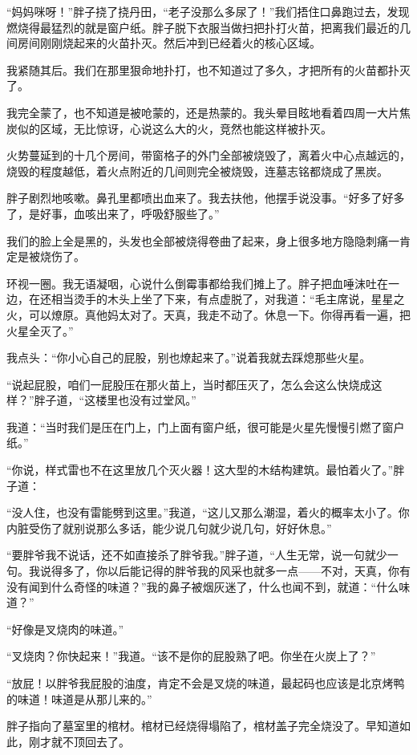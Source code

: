 “妈妈咪呀！”胖子挠了挠丹田，“老子没那么多尿了！”我们捂住口鼻跑过去，发现燃烧得最猛烈的就是窗户纸。胖子脱下衣服当做扫把扑打火苗，把离我们最近的几间房间刚刚烧起来的火苗扑灭。然后冲到已经着火的核心区域。

我紧随其后。我们在那里狠命地扑打，也不知道过了多久，才把所有的火苗都扑灭了。

我完全蒙了，也不知道是被呛蒙的，还是热蒙的。我头晕目眩地看着四周一大片焦炭似的区域，无比惊讶，心说这么大的火，竞然也能这样被扑灭。

火势蔓延到的十几个房间，带窗格子的外门全部被烧毁了，离着火中心点越远的，烧毁的程度越低，着火点附近的几间则完全被烧毁，连墓志铭都烧成了黑炭。

胖子剧烈地咳嗽。鼻孔里都喷出血来了。我去扶他，他摆手说没事。“好多了好多了，是好事，血咳出来了，呼吸舒服些了。”

我们的脸上全是黑的，头发也全部被烧得卷曲了起来，身上很多地方隐隐刺痛一肯定是被烧伤了。

环视一圈。我无语凝咽，心说什么倒霉事都给我们摊上了。胖子把血唾沫吐在一边，在还相当烫手的木头上坐了下来，有点虚脱了，对我道：“毛主席说，星星之火，可以燎原。真他妈太对了。天真，我走不动了。休息一下。你得再看一遍，把火星全灭了。”

我点头：“你小心自己的屁股，别也燎起来了。”说着我就去踩熄那些火星。

“说起屁股，咱们一屁股压在那火苗上，当时都压灭了，怎么会这么快烧成这样？”胖子道，“这楼里也没有过堂风。”

我道：“当时我们是压在门上，门上面有窗户纸，很可能是火星先慢慢引燃了窗户纸。”

“你说，样式雷也不在这里放几个灭火器！这大型的木结构建筑。最怕着火了。”胖子道：

“没人住，也没有雷能劈到这里。”我道，“这儿又那么潮湿，着火的概率太小了。你内脏受伤了就别说那么多话，能少说几句就少说几句，好好休息。”

“要胖爷我不说话，还不如直接杀了胖爷我。”胖子道，“人生无常，说一句就少一句。我说得多了，你以后能记得的胖爷我的风采也就多一点——不对，天真，你有没有闻到什么奇怪的味道？”我的鼻子被烟灰迷了，什么也闻不到，就道：“什么味道？”

“好像是叉烧肉的味道。”

“叉烧肉？你快起来！”我道。“该不是你的屁股熟了吧。你坐在火炭上了？”

“放屁！以胖爷我屁股的油度，肯定不会是叉烧的味道，最起码也应该是北京烤鸭的味道！味道是从那儿来的。”

胖子指向了墓室里的棺材。棺材已经烧得塌陷了，棺材盖子完全烧没了。早知道如此，刚才就不顶回去了。

